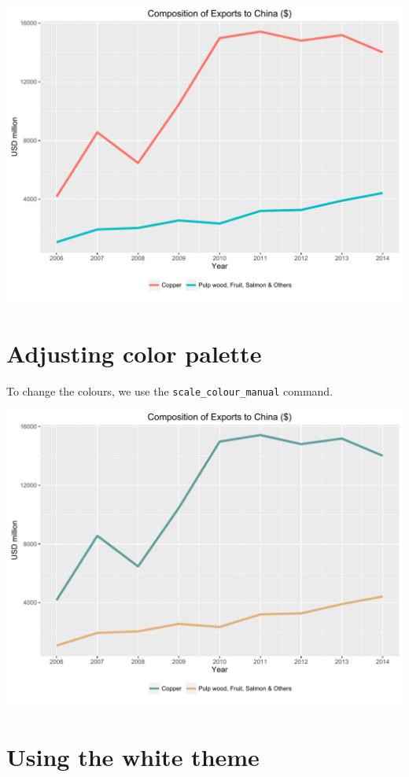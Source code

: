 \begin{center}\includegraphics[width=0.55\linewidth]{figures/line_5-1} \end{center}

\section{Adjusting color palette}\label{adjusting-color-palette}

To change the colours, we use the \texttt{scale\_colour\_manual}
command.

\begin{Shaded}
\begin{Highlighting}[]
\StringTok{ }\NormalTok{(}\NormalTok{, }\NormalTok{)}
\StringTok{ }\StringTok{ }\NormalTok{(}
\end{Highlighting}
\end{Shaded}

\begin{center}\includegraphics[width=0.55\linewidth]{figures/line_6-1} \end{center}

\section{Using the white theme}\label{using-the-white-theme}

